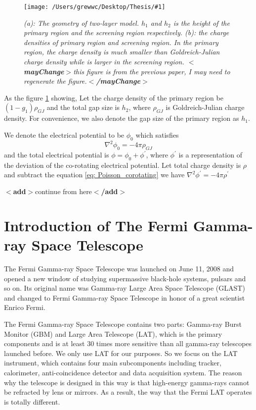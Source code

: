 \documentclass[12pt]{report}
\newcommand{\mycaption}[1]{\caption{\textit{\footnotesize #1}}}
\newcommand{\singleFig}[3]{
 \begin{figure}[!ht]
  \centering
  \texttt{[image: /Users/grewwc/Desktop/Thesis/\#1]}
  \mycaption{#3}
  \label{fig: #1}
 \end{figure} 
}
\newcommand{\add}[1]{
  $<$\textbf{add}$>$#1$<$\textbf{/add}$>$
}
\newcommand{\mayChange}[1]{
  $<$\textbf{mayChange}$>$#1$<$\textbf{/mayChange}$>$
}
\newcommand{\myComment}[1]{
  \newline
}
\begin{document}
          \singleFig{charge_density}{0.6}{(a): The geometry of two-layer model. $h_{1}$ and $h_{2}$ is the height
          of the primary region and the screening region respectively. (b): the charge densities of primary region and 
          screening region. In the primary region, the charge density is much smaller than Goldreich-Julian charge density
          while is larger in the screening region. \mayChange{this figure is from the previous paper, I may need to 
          regenerate the figure.}}
      
          As the figure \ref{fig: charge_density} showing, 
          Let the charge density of the primary region be $(1-g_{1}) \rho_{GJ}$ and the total gap size is 
          $h_{2}$, where $\rho_{GJ}$ is Goldreich-Julian charge density. For convenience, 
          we also denote the gap size of the primary region as $h_{1}$. 
          \myComment{Then we can calculate electric potential and electric field by solving the Poisson equation }

          We denote the electrical potential to be $\phi_{0}$ which satisfies 
          \begin{equation}
            \label{eq: Poisson_corotating}
            \nabla^{2}\phi_{0} = -4\pi\rho_{GJ}
          \end{equation}
          and the total electrical potential is $\phi = \phi_{0} + \phi^{\prime}$, where $\phi^{\prime}$ is a 
          representation of the deviation of the co-rotating electrical potential.  
          Let total charge density is $\rho$ and subtract the equation \ref{eq: Poisson_corotating} we have 
          $\nabla^{2}\phi^{\prime} = -4\pi\rho^{\prime}$


          \add{continue from here}

        \section{Introduction of The Fermi Gamma-ray Space Telescope}
          The Fermi Gamma-ray Space Telescope was launched on June 11, 2008 and opened a new window of studying
          supermassive black-hole systems, pulsars and so on. Its original name was Gamma-ray Large Area Space 
          Telescope (GLAST) and changed to Fermi Gamma-ray Space Telescope in honor of a great scientist 
          Enrico Fermi.

          The Fermi Gamma-ray Space Telescope contains two parts: Gamma-ray Burst Monitor (GBM) and Large 
          Area Telescope (LAT), which is the primary components and is at least 30 times more sensitive than 
          all gamma-ray telescopes launched before. We only use LAT for our purposes. So we 
          focus on the LAT instrument, which contains four main subcomponents including tracker, calorimeter,
          anti-coincidence detector and data acquisition system. The reason why the telescope is designed in 
          this way is that high-energy gamma-rays cannot be refracted by lens or mirrors. As a result, the way
          that the Fermi LAT operates is totally different. 
\end{document}
